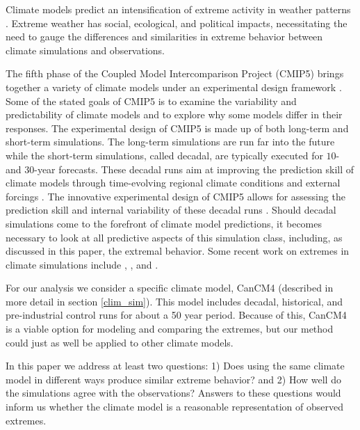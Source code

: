 Climate models predict an intensification of extreme activity in weather patterns \citep{easterling2000climate}. Extreme weather has social, ecological, and political impacts, necessitating the need to gauge the differences and similarities in extreme behavior between climate simulations and observations.

The fifth phase of the Coupled Model Intercomparison Project (CMIP5) brings together a variety of climate models under an experimental design framework \citep{taylor2012overview,hibbard2007strategy}. Some of the stated goals of CMIP5 is to examine the variability and predictability of climate models and to explore why some models differ in their responses. The experimental design of CMIP5 is made up of both long-term and short-term simulations. The long-term simulations are run far into the future while the short-term simulations, called decadal, are typically executed for $10$- and $30$-year forecasts. These decadal runs aim at improving the prediction skill of climate models through time-evolving regional climate conditions and external forcings \citep{meehl2009decadal}. The innovative experimental design of CMIP5 allows for assessing the prediction skill and internal variability of these decadal runs \citep{kim2012evaluation}. Should decadal simulations come to the forefront of climate model predictions, it becomes necessary to look at all predictive aspects of this simulation class, including, as discussed in this paper, the extremal behavior. Some recent work on extremes in climate simulations include \cite{weller2012investigation}, \cite{weller2013two}, and \cite{fix2016comparison}.

For our analysis we consider a specific climate model, CanCM4 (described in more detail in section \ref{clim_sim}). This model includes decadal, historical, and pre-industrial control runs for about a 50 year period. Because of this, CanCM4 is a viable option for modeling and comparing the extremes, but our method could just as well be applied to other climate models.

In this paper we address at least two questions: 1) Does using the same climate model in different ways produce similar extreme behavior? and 2) How well do the simulations agree with the observations? Answers to these questions would inform us whether the climate model is a reasonable representation of observed extremes.


